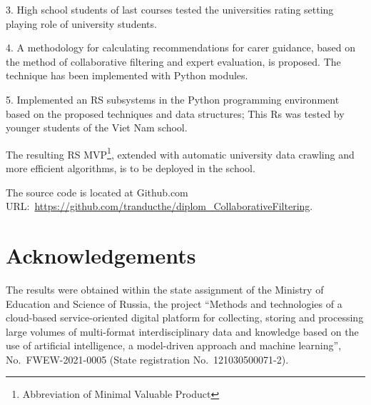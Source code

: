 \documentclass[conference,a4]{IEEEtran}
\begin{document}
3. High school students of last courses tested the universities rating setting playing role of university students.

4. A methodology for calculating recommendations for carer guidance, based on the method of collaborative filtering and expert evaluation, is proposed.  The technique has been implemented with Python modules.

5. Implemented an RS subsystems in the Python programming environment based on the proposed techniques and data structures; This Rs was tested by younger students of the Viet Nam school.

The resulting RS MVP\footnote{Abbreviation of Minimal Valuable Product}, extended with automatic university data crawling and more efficient algorithms, is to be deployed in the school.

The source code is located at Github.com URL:~\url{https://github.com/tranducthe/diplom_CollaborativeFiltering}.


\section*{Acknowledgements}
\label{sec:ack}

The results were obtained within the state assignment of the Ministry of Education and Science of Russia, the project ``Methods and technologies of a cloud-based service-oriented digital platform for collecting, storing and processing large volumes of multi-format interdisciplinary data and knowledge based on the use of artificial intelligence, a model-driven approach and machine learning'', No.~FWEW-2021-0005 (State registration No.~121030500071-2).


\end{document}
